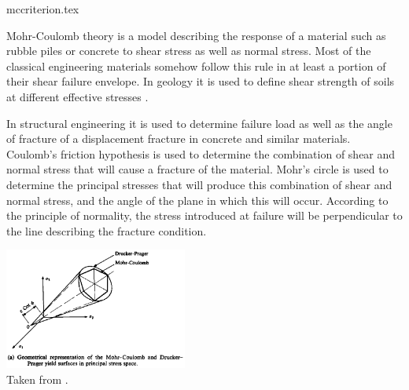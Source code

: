 \begin{flushright} {\tiny {\color{gray} mccriterion.tex}} \end{flushright}

Mohr-Coulomb theory is a model describing the response of a material such as rubble piles or concrete to shear stress as well as normal stress. 
Most of the classical engineering materials somehow follow this rule in at least a portion of their shear failure envelope. In geology it is used to define shear strength of soils at different effective stresses \cite{hand69}.

In structural engineering it is used to determine failure load as well as the angle of fracture of a displacement fracture in concrete and similar materials. Coulomb's friction hypothesis is used to determine the combination of shear and normal stress that will cause a fracture of the material. Mohr's circle is used to determine the principal stresses that will produce this combination of shear and normal stress, and the angle of the plane in which this will occur. According to the principle of normality, the stress introduced at failure will be perpendicular to the line describing the fracture condition.


\begin{center}
\includegraphics[width=6cm]{images/rheology/owenhinton5}\\
{\captionfont Taken from \textcite{owhi}.}
\end{center}

